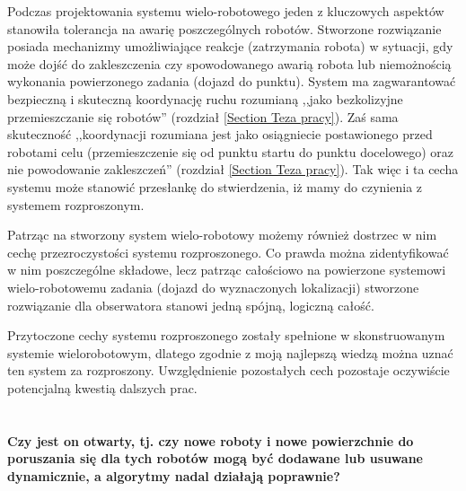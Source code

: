 \begin{frame}
{Podczas projektowania systemu wielo-robotowego jeden z kluczowych aspektów stanowiła tolerancja na awarię poszczególnych robotów. Stworzone rozwiązanie posiada mechanizmy umożliwiające reakcje (zatrzymania robota) w sytuacji, gdy może dojść do zakleszczenia czy spowodowanego awarią robota lub niemożnością wykonania powierzonego zadania (dojazd do punktu). System ma zagwarantować bezpieczną i skuteczną koordynację ruchu rozumianą ,,jako bezkolizyjne przemieszczanie się robotów'' (rozdział \ref{Section Teza pracy}). Zaś sama skuteczność ,,koordynacji rozumiana jest jako osiągniecie postawionego przed robotami celu (przemieszczenie się od punktu startu do punktu docelowego) oraz nie powodowanie zakleszczeń'' (rozdział \ref{Section Teza pracy}). Tak więc i ta cecha systemu może stanowić przesłankę do stwierdzenia, iż mamy do czynienia z systemem rozproszonym.

Patrząc na stworzony system wielo-robotowy możemy również dostrzec w nim cechę  przezroczystości systemu rozproszonego. Co prawda można zidentyfikować w nim poszczególne składowe, lecz patrząc całościowo na powierzone systemowi wielo-robotowemu zadania (dojazd do wyznaczonych lokalizacji) stworzone rozwiązanie dla obserwatora stanowi jedną spójną,  logiczną całość. 

Przytoczone cechy systemu rozproszonego zostały spełnione w skonstruowanym systemie wielorobotowym, dlatego zgodnie z moją najlepszą wiedzą można uznać ten system za rozproszony. Uwzględnienie pozostałych cech pozostaje oczywiście potencjalną kwestią dalszych prac.
}
\end{frame}

\section*{}
\begin{frame}
\frametitle{\secname}
\begin{center}
	\textbf{Czy jest on otwarty, tj. czy nowe roboty i nowe powierzchnie do poruszania się dla tych robotów mogą być dodawane lub usuwane dynamicznie, a algorytmy nadal działają poprawnie?}
\end{center}
\end{frame}

